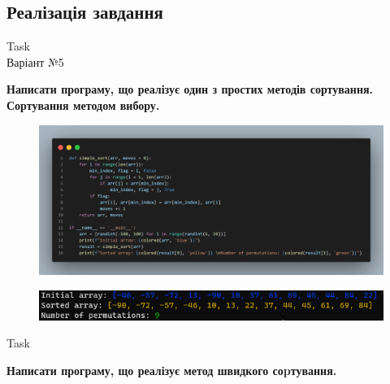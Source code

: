 \documentclass[a4paper,12pt]{article}
\newcommand{\RomanNumeralCaps}[1]{\MakeUppercase{\romannumeral #1}}
\begin{document}
\newpage
    \begin{center}
        \section*{\bfseries{Реалізація завдання}}
    \end{center}
    \begin{center}
        \Large{Task \RomanNumeralCaps{1}} \\
        \Large{Варіант №5}
    \end{center}
    \textbf{Написати програму, що реалізує один з простих методів сортування.
    Сортування методом вибору.}
    \begin{figure}[h!]
        \begin{minipage}[h]{1\linewidth}
            \centering
            \includegraphics[width=1\linewidth]{Prt sc/Figure_1.png}  
        \end{minipage}
    \end{figure}
    \begin{figure}[h!]
        \begin{minipage}[h]{1\linewidth}
            \centering
            \includegraphics[width=1\linewidth]{Prt sc/Figure_2.png}
        \end{minipage}
    \end{figure}

    \begin{center}
        \Large{Task \RomanNumeralCaps{2}}
    \end{center}
    \textbf{Написати програму, що реалізує метод швидкого соpтування.}
\end{document}
